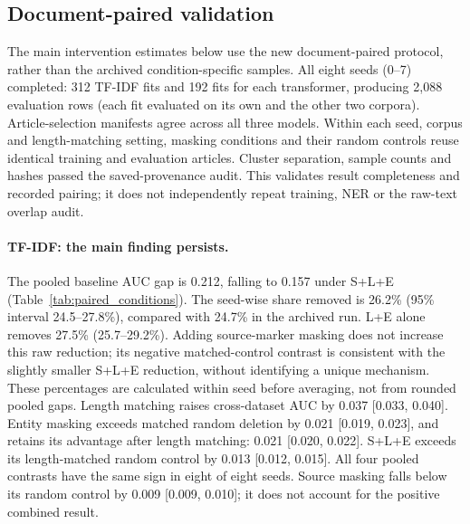 \subsection{Document-paired validation}\label{sec:paired}
The main intervention estimates below use the new document-paired protocol, rather than the archived condition-specific samples. All eight seeds (0--7) completed: 312 TF-IDF fits and 192 fits for each transformer, producing 2,088 evaluation rows (each fit evaluated on its own and the other two corpora). Article-selection manifests agree across all three models. Within each seed, corpus and length-matching setting, masking conditions and their random controls reuse identical training and evaluation articles. Cluster separation, sample counts and hashes passed the saved-provenance audit. This validates result completeness and recorded pairing; it does not independently repeat training, NER or the raw-text overlap audit.

\paragraph{TF-IDF: the main finding persists.}
The pooled baseline AUC gap is 0.212, falling to 0.157 under S+L+E (Table~\ref{tab:paired_conditions}). The seed-wise share removed is 26.2\% (95\% interval 24.5--27.8\%), compared with 24.7\% in the archived run. L+E alone removes 27.5\% (25.7--29.2\%). Adding source-marker masking does not increase this raw reduction; its negative matched-control contrast is consistent with the slightly smaller S+L+E reduction, without identifying a unique mechanism. These percentages are calculated within seed before averaging, not from rounded pooled gaps. Length matching raises cross-dataset AUC by 0.037 [0.033, 0.040]. Entity masking exceeds matched random deletion by 0.021 [0.019, 0.023], and retains its advantage after length matching: 0.021 [0.020, 0.022]. S+L+E exceeds its length-matched random control by 0.013 [0.012, 0.015]. All four pooled contrasts have the same sign in eight of eight seeds. Source masking falls below its random control by 0.009 [0.009, 0.010]; it does not account for the positive combined result.

\begin{table}[t]
\caption{Document-paired validation: pooled cross-dataset AUC and AUC gap (mean and 95\% interval over eight seeds). Six ordered pairs are averaged within seed.}\label{tab:paired_conditions}
\centering\footnotesize
{}
\end{table}

